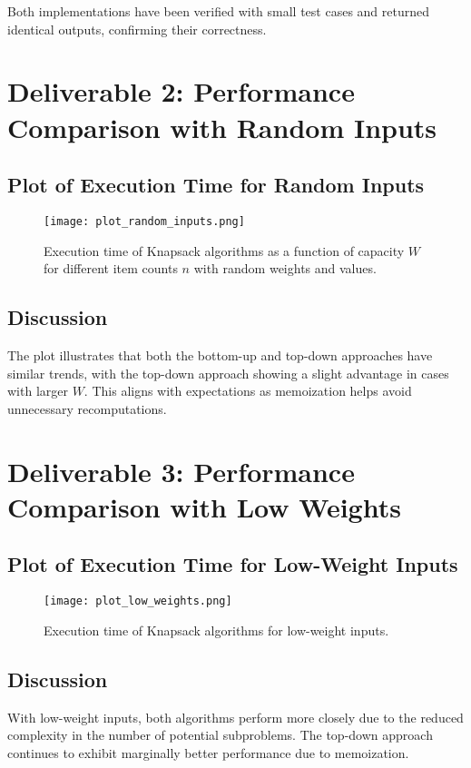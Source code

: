 \documentclass{article}
\begin{document}
Both implementations have been verified with small test cases and returned identical outputs, confirming their correctness.

\section{Deliverable 2: Performance Comparison with Random Inputs}
\subsection*{Plot of Execution Time for Random Inputs}
\begin{figure}[h!]
    \centering
    \texttt{[image: plot\_random\_inputs.png]}
    \caption{Execution time of Knapsack algorithms as a function of capacity \( W \) for different item counts \( n \) with random weights and values.}
\end{figure}

\subsection*{Discussion}
The plot illustrates that both the bottom-up and top-down approaches have similar trends, with the top-down approach showing a slight advantage in cases with larger \( W \). This aligns with expectations as memoization helps avoid unnecessary recomputations.

\section{Deliverable 3: Performance Comparison with Low Weights}
\subsection*{Plot of Execution Time for Low-Weight Inputs}
\begin{figure}[h!]
    \centering
    \texttt{[image: plot\_low\_weights.png]}
    \caption{Execution time of Knapsack algorithms for low-weight inputs.}
\end{figure}

\subsection*{Discussion}
With low-weight inputs, both algorithms perform more closely due to the reduced complexity in the number of potential subproblems. The top-down approach continues to exhibit marginally better performance due to memoization.
\end{document}
